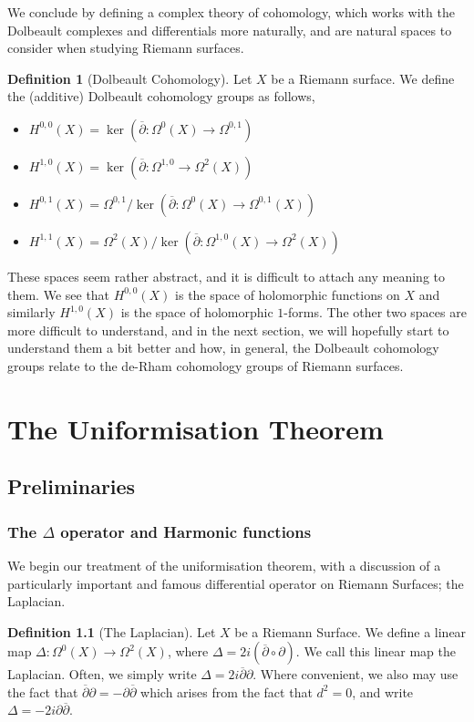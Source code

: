 \documentclass[11pt]{report}
\theoremstyle{definition}
\newtheorem{defn}[thm]{Definition}
\begin{document}
We conclude by defining a complex theory of cohomology, which works with the Dolbeault complexes and differentials more naturally, and are natural spaces to consider when studying Riemann surfaces.
\begin{defn}[Dolbeault Cohomology]
  Let $X$ be a Riemann surface. We define the (additive) Dolbeault cohomology groups as follows,
  \begin{itemize}
    \item $H^{0,0}(X) = \ker(\overline{\partial}:\Omega^0(X)\rightarrow \Omega^{0,1})$
    \item $H^{1,0}(X) = \ker(\overline{\partial}:\Omega^{1,0}\rightarrow \Omega^2(X))$
    \item $H^{0,1}(X) = \Omega^{0,1}/\ker(\overline{\partial}:\Omega^0(X)\rightarrow \Omega^{0,1}(X))$
    \item $H^{1,1}(X) = \Omega^2(X)/\ker(\overline{\partial}:\Omega^{1,0}(X) \rightarrow \Omega^2(X))$
  \end{itemize}
\end{defn}
These spaces seem rather abstract, and it is difficult to attach any meaning to them. We see that $H^{0,0}(X)$ is the space of holomorphic functions on $X$ and similarly $H^{1,0}(X)$ is the space of holomorphic $1$-forms. The other two spaces are more difficult to understand, and in the next section, we will hopefully start to understand them a bit better and how, in general, the Dolbeault cohomology groups relate to the de-Rham cohomology groups of Riemann surfaces.
\newpage
\chapter{The Uniformisation Theorem}
\section{Preliminaries}
\subsection{The $\Delta$ operator and Harmonic functions}
We begin our treatment of the uniformisation theorem, with a discussion of a particularly important and famous differential operator on Riemann Surfaces; the Laplacian.

\begin{defn}[The Laplacian]\label{LaplacianDef}
  Let $X$ be a Riemann Surface. We define a linear map $\Delta:\Omega^0(X)\rightarrow \Omega^2(X)$, where $\Delta=2i(\overline{\partial}\circ \partial)$. We call this linear map the Laplacian. Often, we simply write $\Delta=2i\overline{\partial}\partial$. Where convenient, we also may use the fact that $\overline{\partial}\partial = -\partial\overline{\partial}$ which arises from the fact that $d^2 = 0$, and write $\Delta = -2i\partial\overline{\partial}$.
\end{defn}
\end{document}
